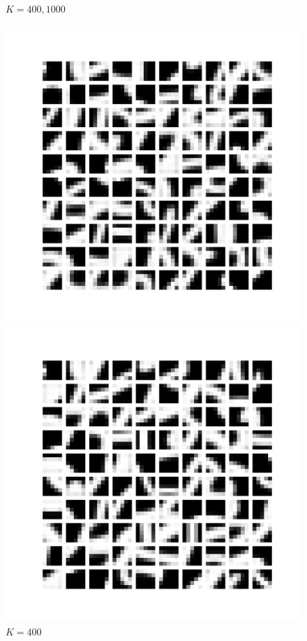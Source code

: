 \documentclass{article}
\begin{document}
\begin{itemize}
\begin{figure}[htbp!]
\begin{minipage}{0.4\textwidth}
        \caption{$K = 200$}
        \label{fig:200-centroids}
    \end{minipage}
\item $K = 400, 1000$    
    \begin{minipage}{0.4\textwidth}
        \centering
        \includegraphics[width=\textwidth]{K-means/Result/Centroids/400-clusters-centroids.png}
        \caption{$K = 400$}
        \label{fig:400-centroids}
    \end{minipage}%
    \begin{minipage}{0.4\textwidth}
        \centering
        \includegraphics[width=\textwidth]{K-means/Result/Centroids/1000-clusters-centroids.png}

\end{minipage}
\end{figure}
\end{itemize}
\end{document}
